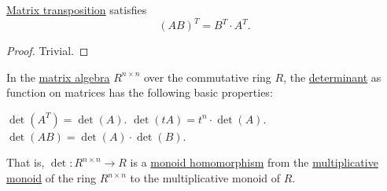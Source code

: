 \begin{proposition}\label{thm:transpose_matrix_reorder}
  \hyperref[def:transpose_matrix]{Matrix transposition} satisfies
  \begin{equation}\label{eq:thm:transpose_matrix_reorder}
    (AB)^T = B^T \cdot A^T.
  \end{equation}
\end{proposition}
\begin{proof}
  Trivial.
\end{proof}

\begin{proposition}\label{thm:def:matrix_determinant}
  In the \hyperref[thm:matrix_algebra]{matrix algebra} \( R^{n \times n} \) over the commutative ring \( R \), the \hyperref[def:matrix_determinant]{determinant} as function on matrices has the following basic properties:
  \begin{thmenum}
     \( \det(A^T) = \det(A) \).
     \( \det(tA) = t^n \cdot \det(A) \).
     \( \det(AB) = \det(A) \cdot \det(B) \).

    That is, \( \det: R^{n \times n} \to R \) is a \hyperref[def:monoid/homomorphism]{monoid homomorphism} from the \hyperref[def:semiring]{multiplicative monoid} of the ring \( R^{n \times n} \) to the multiplicative monoid of \( R \).
  \end{thmenum}
\end{proposition}
